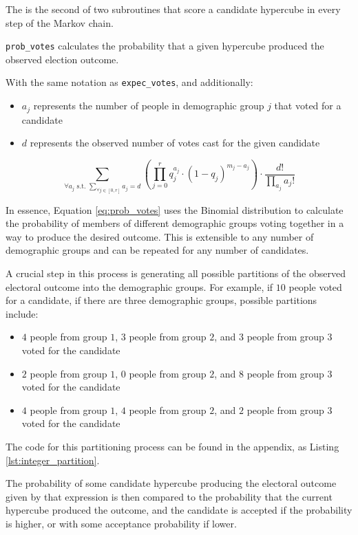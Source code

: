 The is the second of two subroutines that score a candidate hypercube in every step of the Markov chain.

\texttt{prob\_votes} calculates the probability that a given hypercube produced the observed election outcome.

With the same notation as \texttt{expec\_votes}, and additionally:

\begin{itemize}
  \item $a_j$ represents the number of people in demographic group $j$ that voted for a candidate
  \item $d$ represents the observed number of votes cast for the given candidate
\end{itemize}

\begin{equation}
 \sum_{\forall a_j \text{ s.t. } \sum_{\forall j \in [0, r]} a_j = d} \left(\prod_{j = 0}^r q_j^{a_j} \cdot (1 - q_j)^{m_j - a_j}\right) \cdot \frac{d!}{\prod_{a_j}a_j!}
 \label{eq:prob_votes}
\end{equation}

In essence, Equation \ref{eq:prob_votes} uses the Binomial distribution to calculate the probability of members of different demographic groups voting together in a way to produce the desired outcome. This is extensible to any number of demographic groups and can be repeated for any number of candidates.

A crucial step in this process is generating all possible partitions of the observed electoral outcome into the demographic groups. For example, if $10$ people voted for a candidate, if there are three demographic groups, possible partitions include:

\begin{itemize}
  \item $4$ people from group $1$, $3$ people from group $2$, and $3$ people from group $3$ voted for the candidate
  \item $2$ people from group $1$, $0$ people from group $2$, and $8$ people from group $3$ voted for the candidate
  \item $4$ people from group $1$, $4$ people from group $2$, and $2$ people from group $3$ voted for the candidate
\end{itemize}

The code for this partitioning process can be found in the appendix, as Listing \ref{lst:integer_partition}.

The probability of some candidate hypercube producing the electoral outcome given by that expression is then compared to the probability that the current hypercube produced the outcome, and the candidate is accepted if the probability is higher, or with some acceptance probability if lower.

